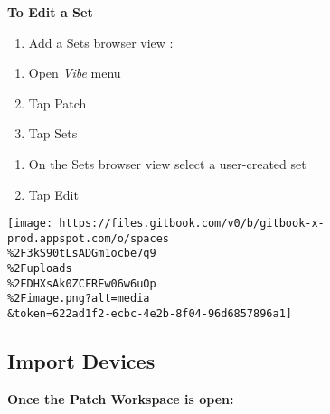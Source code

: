 \documentclass[
]{article}
\providecommand{\tightlist}{%
  \setlength{\itemsep}{0pt}\setlength{\parskip}{0pt}}
\begin{document}
\textbf{To Edit a Set}

\begin{enumerate}
\def\labelenumi{\arabic{enumi}.}
\tightlist
\item
  Add a Sets browser view :
\end{enumerate}

\begin{enumerate}
\def\labelenumi{\alph{enumi}.}
\tightlist
\item
  Open \emph{Vibe} menu
\item
  Tap Patch
\item
  Tap Sets
\end{enumerate}

\begin{enumerate}
\def\labelenumi{\arabic{enumi}.}
\setcounter{enumi}{1}
\item
  On the Sets browser view select a user-created set
\item
  Tap Edit
\end{enumerate}

\texttt{[image: https://files.gitbook.com/v0/b/gitbook-x-prod.appspot.com/o/spaces\\\%2F3kS90tLsADGm1ocbe7q9\\\%2Fuploads\\\%2FDHXsAk0ZCFREw06w6uOp\\\%2Fimage.png?alt=media\\\&token=622ad1f2-ecbc-4e2b-8f04-96d6857896a1]}

\hypertarget{import-devices}{%
\subsection{Import Devices}\label{import-devices}}

\textbf{Once the Patch Workspace is open:}
\end{document}
